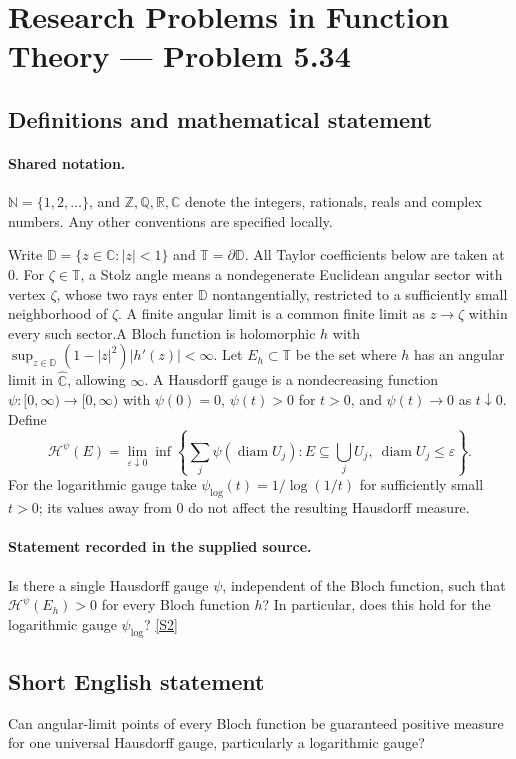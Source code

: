 \documentclass[11pt]{article}
\newcommand{\sref}[2]{\hyperlink{source:#1:#2}{[S#2]}}
\begin{document}
\section{Research Problems in Function Theory — Problem 5.34}\label{statement}

\subsection{Definitions and mathematical statement}

\paragraph{Shared notation.}$\mathbb N=\{1,2,\ldots\}$, and $\mathbb Z,\mathbb Q,\mathbb R,\mathbb C$ denote the integers, rationals, reals and complex numbers. Any other conventions are specified locally.


Write $\mathbb D=\{z\in\mathbb C:|z|<1\}$ and $\mathbb T=\partial\mathbb D$. All Taylor coefficients below are taken at $0$. For $\zeta\in\mathbb T$, a Stolz angle means a nondegenerate Euclidean angular sector with vertex $\zeta$, whose two rays enter $\mathbb D$ nontangentially, restricted to a sufficiently small neighborhood of $\zeta$. A finite angular limit is a common finite limit as $z\to\zeta$ within every such sector.A Bloch function is holomorphic $h$ with $\sup_{z\in\mathbb D}(1-|z|^2)|h'(z)|<\infty$. Let $E_h\subset\mathbb T$ be the set where $h$ has an angular limit in $\widehat{\mathbb C}$, allowing $\infty$. A Hausdorff gauge is a nondecreasing function $\psi:[0,\infty)\to[0,\infty)$ with $\psi(0)=0$, $\psi(t)>0$ for $t>0$, and $\psi(t)\to0$ as $t\downarrow0$. Define
\[\mathcal H^\psi(E)=\lim_{\varepsilon\downarrow0}\inf\left\{\sum_j\psi(\operatorname{diam}U_j):E\subseteq\bigcup_j U_j,\ \operatorname{diam}U_j\le\varepsilon\right\}.
\]
For the logarithmic gauge take $\psi_{\log}(t)=1/\log(1/t)$ for sufficiently small $t>0$; its values away from $0$ do not affect the resulting Hausdorff measure.
\paragraph{Statement recorded in the supplied source.}
Is there a single Hausdorff gauge $\psi$, independent of the Bloch function, such that $\mathcal H^\psi(E_h)>0$ for every Bloch function $h$? In particular, does this hold for the logarithmic gauge $\psi_{\log}$? \sref{statement}{2}
\subsection{Short English statement}
Can angular-limit points of every Bloch function be guaranteed positive measure for one universal Hausdorff gauge, particularly a logarithmic gauge?
\end{document}
